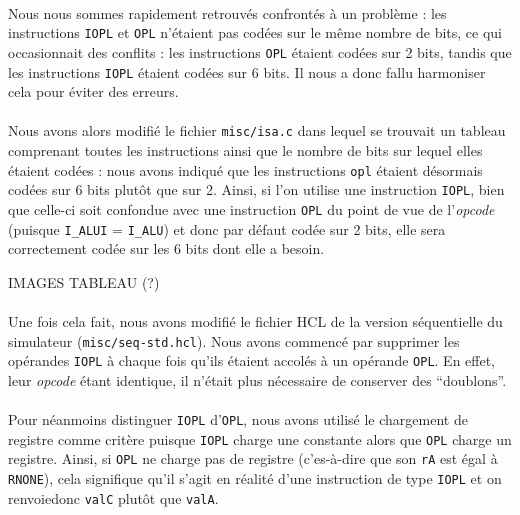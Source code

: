 \documentclass[12pt]{article}
\begin{document}
\paragraph{}Nous nous sommes rapidement retrouvés confrontés à un problème : les instructions \verb+IOPL+ et \verb+OPL+ n'étaient pas codées sur le même nombre de bits, ce qui occasionnait des conflits : les instructions \verb+OPL+ étaient codées sur 2 bits, tandis que les instructions \verb+IOPL+ étaient codées sur 6 bits. Il nous a donc fallu harmoniser cela pour éviter des erreurs.

\paragraph{}Nous avons alors modifié le fichier \verb+misc/isa.c+ dans lequel se trouvait un tableau comprenant toutes les instructions ainsi que le nombre de bits sur lequel elles étaient codées : nous avons indiqué que les instructions \verb+opl+ étaient désormais codées sur 6 bits plutôt que sur 2. Ainsi, si l'on utilise une instruction \verb+IOPL+, bien que celle-ci soit confondue avec une instruction \verb+OPL+ du point de vue de l'{\itshape opcode} (puisque \verb+I_ALUI+ = \verb+I_ALU+) et donc par défaut codée sur 2 bits, elle sera correctement codée sur les 6 bits dont elle a besoin. 

IMAGES TABLEAU (?)

\paragraph{}Une fois cela fait, nous avons modifié le fichier HCL de la version séquentielle du simulateur (\verb+misc/seq-std.hcl+). Nous avons commencé par supprimer les opérandes \verb+IOPL+ à chaque fois qu'ils étaient accolés à un opérande \verb+OPL+. En effet, leur {\itshape opcode} étant identique, il n'était plus nécessaire de conserver des ``doublons''.

\paragraph{}Pour néanmoins distinguer \verb+IOPL+ d'\verb+OPL+, nous avons utilisé le chargement de registre comme critère puisque \verb+IOPL+ charge une constante alors que \verb+OPL+ charge un registre. Ainsi, si \verb+OPL+ ne charge pas de registre (c'es-à-dire que son \verb+rA+ est égal à \verb+RNONE+), cela signifique qu'il s'agit en réalité d'une instruction de type \verb+IOPL+ et on renvoiedonc \verb+valC+ plutôt que \verb+valA+.
\end{document}
